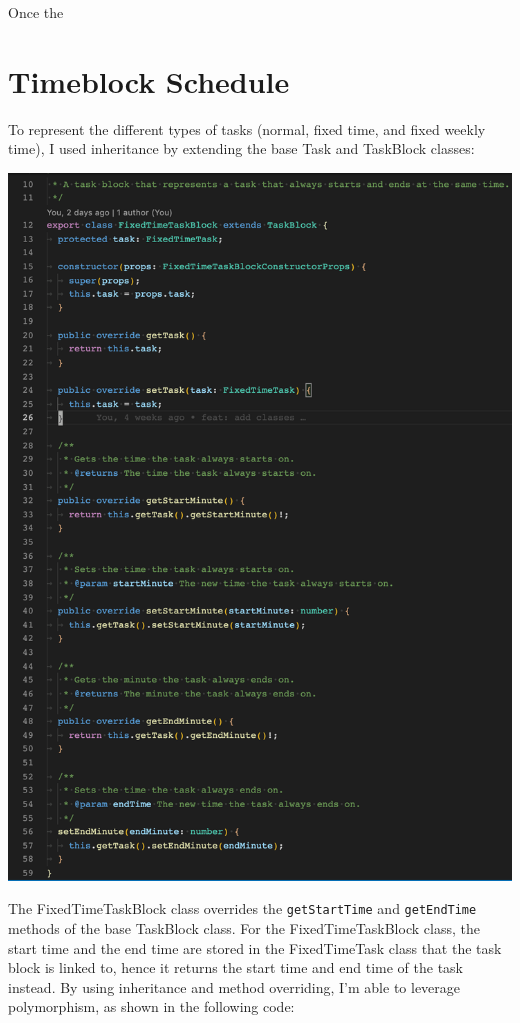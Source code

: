 \documentclass[notitlepage, 12pt]{report}
\newcommand{\code}[1]{\texttt{#1}}
\begin{document}
Once the

\section*{Timeblock Schedule}

To represent the different types of tasks (normal, fixed time, and fixed weekly time), I used inheritance by extending the base Task and TaskBlock classes:

\includegraphics[width=1\textwidth]{inheritance.png}

The FixedTimeTaskBlock class overrides the \code{getStartTime} and \code{getEndTime} methods of the base TaskBlock class. For the FixedTimeTaskBlock class, the start time and the end time are stored in the FixedTimeTask class that the task block is linked to, hence it returns the start time and end time of the task instead. By using inheritance and method overriding, I'm able to leverage polymorphism, as shown in the following code:
\end{document}
